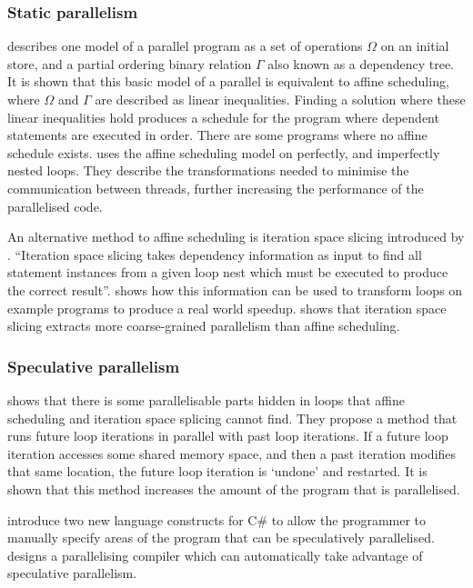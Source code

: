 \subsubsection{Static parallelism}
\textcite{Feautrier1992} describes one model of a parallel program as a set of operations $\Omega$ on an initial store, and a partial ordering binary relation $\Gamma$ also known as a dependency tree. It is shown that this basic model of a parallel is equivalent to affine scheduling, where $\Omega$ and $\Gamma$ are described as linear inequalities. Finding a solution where these linear inequalities hold produces a schedule for the program where dependent statements are executed in order. There are some programs where no affine schedule exists.
\textcite{Bondhugula2008} uses the affine scheduling model on perfectly, and imperfectly nested loops. They describe the transformations needed to minimise the communication between threads, further increasing the performance of the parallelised code.

An alternative method to affine scheduling is iteration space slicing introduced by \textcite{Pugh1997}. ``Iteration space slicing takes dependency information as input to find all statement instances from a given loop nest which must be executed to produce the correct result''. \textcite{Pugh1997} shows how this information can be used to transform loops on example programs to produce a real world speedup. \textcite{Beletska2011} shows that iteration space slicing extracts more coarse-grained parallelism than affine scheduling.

\subsubsection{Speculative parallelism}
\textcite{Zhong2008} shows that there is some parallelisable parts hidden in loops that affine scheduling and iteration space splicing cannot find. They propose a method that runs future loop iterations in parallel with past loop iterations. If a future loop iteration accesses some shared memory space, and then a past iteration modifies that same location, the future loop iteration is `undone' and restarted. It is shown that this method increases the amount of the program that is parallelised.

\textcite{Prabhu2010} introduce two new language constructs for C\# to allow the programmer to manually specify areas of the program that can be speculatively parallelised. \textcite{Yiapanis2015} designs a parallelising compiler which can automatically take advantage of speculative parallelism.

